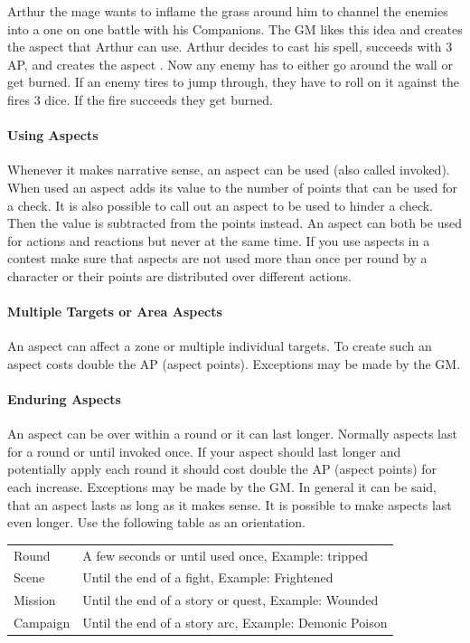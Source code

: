 \documentclass[11pt]{article}
\begin{document}
{\begin{pwexample}
Arthur the mage wants to inflame the grass around him to channel the enemies into a one on one battle with his Companions. The GM likes this idea and creates the aspect  that Arthur can use. Arthur decides to cast his spell, succeeds with 3 AP, and creates the aspect . Now any enemy has to either go around the wall or get burned. If an enemy tires to jump through, they have to roll on it against the fires 3 dice. If the fire succeeds they get burned.
\end{pwexample}
\paragraph*{Using Aspects}
\label{sec:org2490dd6}

Whenever it makes narrative sense, an aspect can be used (also called invoked). When used an aspect adds its value to the number of points that can be used for a check. It is also possible to call out an aspect to be used to hinder a check. Then the value is subtracted from the points instead. An aspect can both be used for actions and reactions but never at the same time. If you use  aspects in a contest make sure that aspects are not used more than once per round by a character or their points are distributed over different actions.
\paragraph*{Multiple Targets or Area Aspects}
\label{sec:org351c28f}
An aspect can affect a zone or multiple individual targets. To create such an aspect costs double the AP (aspect points). Exceptions may be made by the GM. 
\paragraph*{Enduring Aspects}
\label{sec:orgd783730}
An aspect can be over within a round or it can last longer. Normally aspects last for a round or until invoked once. If your aspect should last longer and potentially apply each round it should cost double the AP (aspect points) for each increase. Exceptions may be made by the GM. In general it can be said, that an aspect lasts as long as it makes sense. It is possible to make aspects last even longer. Use the following table as an orientation.
\begin{center}
\begin{tabular}{ll}
Round & A few seconds or until used once, Example: tripped\\
Scene & Until the end of a fight, Example: Frightened\\
Mission & Until the end of a story or quest, Example: Wounded\\
Campaign & Until the end of a story arc, Example: Demonic Poison\\
\end{tabular}
\end{center}

}
\end{document}
